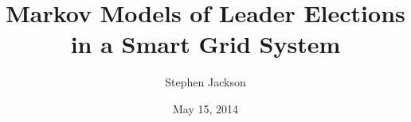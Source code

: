\documentclass[12pt,oneside]{article}
\begin{document}
\title{Markov Models of Leader Elections in a Smart Grid System}
\author{Stephen Jackson}
\date{May 15, 2014}
\maketitle





\end{document}

